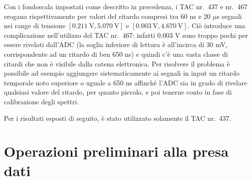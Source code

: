 \documentclass[10pt, oneside, a4paper]{article}   	%
\begin{document}
%
%
Con i fondoscala impostati come descritto in precedenza, i TAC nr.~437 e nr.~467 erogano rispettivamente per valori del ritardo compresi tra 60 ns e 20 $\mu$s segnali nei range di tensione $[0.211 \ \mbox{V}, 5.070 \ \mbox{V}]$ e $[0.003 \ \mbox{V}, 4.670 \ \mbox{V}]$. Ciò introduce una complicazione nell'utilizzo del TAC nr.~467: infatti  0.003 V sono troppo pochi per essere rivelati dall'ADC (la soglia inferiore di lettura è all'incirca di 30 mV, corrispondente ad un ritardo di ben 650 ns) e quindi c'è una vasta classe di ritardi che non è visibile dalla catena elettronica. Per risolvere il problema è possibile ad esempio aggiungere sistematicamente ai segnali in input un ritardo temporale noto superiore o uguale a 650 ns affinchè l'ADC sia in grado di rivelare qualsiasi valore del ritardo, per quanto piccolo, e poi tenerne conto in fase di calibrazione degli spettri. 

Per i risultati esposti di seguito, è stato utilizzato solamente il TAC nr.~437.
%
%
\section{Operazioni preliminari alla presa dati}
\end{document}
